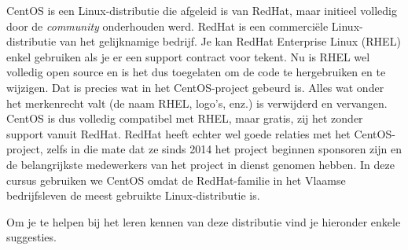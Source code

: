 CentOS is een Linux-distributie die afgeleid is van RedHat, maar initieel volledig door de \emph{community} onderhouden werd. RedHat is een commerciële Linux-dis\-tri\-bu\-tie van het gelijknamige bedrijf. Je kan RedHat Enterprise Linux (RHEL) enkel gebruiken als je er een support contract voor tekent. Nu is RHEL wel volledig open source en is het dus toegelaten om de code te hergebruiken en te wijzigen. Dat is precies wat in het CentOS-project gebeurd is. Alles wat onder het merkenrecht valt (de naam RHEL, logo's, enz.) is verwijderd en vervangen. CentOS is dus volledig compatibel met RHEL, maar gratis, zij het zonder support vanuit RedHat. RedHat heeft echter wel goede relaties met het CentOS-project, zelfs in die mate dat ze sinds 2014 het project beginnen sponsoren zijn en de belangrijkste medewerkers van het project in dienst genomen hebben. In deze cursus gebruiken we CentOS omdat de RedHat-familie in het Vlaamse bedrijfsleven de meest gebruikte Linux-dis\-tri\-bu\-tie is.

Om je te helpen bij het leren kennen van deze distributie vind je hieronder enkele suggesties.

